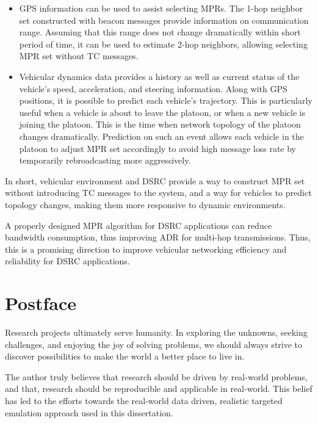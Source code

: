 \documentclass[12pt]{report}
\begin{document}
\begin{itemize}
  \item GPS information can be used to assist selecting MPRs. The 1-hop neighbor set constructed with beacon messages provide information on communication range. Assuming that this range does not change dramatically within short period of time, it can be used to estimate 2-hop neighbors, allowing selecting MPR set without TC messages.
  \item Vehicular dynamics data provides a history as well as current status of the vehicle's speed, acceleration, and steering information. Along with GPS positions, it is possible to predict each vehicle's trajectory. This is particularly useful when a vehicle is about to leave the platoon, or when a new vehicle is joining the platoon. This is the time when network topology of the platoon changes dramatically. Prediction on such an event allows each vehicle in the platoon to adjust MPR set accordingly to avoid high message loss rate by temporarily rebroadcasting more aggressively.
\end{itemize}

In short, vehicular environment and DSRC provide a way to construct MPR set without introducing TC messages to the system, and a way for vehicles to predict topology changes, making them more responsive to dynamic environments.

A properly designed MPR algorithm for DSRC applications can reduce bandwidth consumption, thus improving ADR for multi-hop transmissions. Thus, this is a promising direction to improve vehicular networking efficiency and reliability for DSRC applications.





\chapter*{Postface}
%

Research projects ultimately serve humanity. In exploring the unknowns, seeking challenges, and enjoying the joy of solving problems, we should always strive to discover possibilities to make the world a better place to live in.

The author truly believes that research should be driven by real-world problems, and that, research should be reproducible and applicable in real-world. This belief has led to the efforts towards the real-world data driven, realistic targeted emulation approach used in this dissertation.
\end{document}

